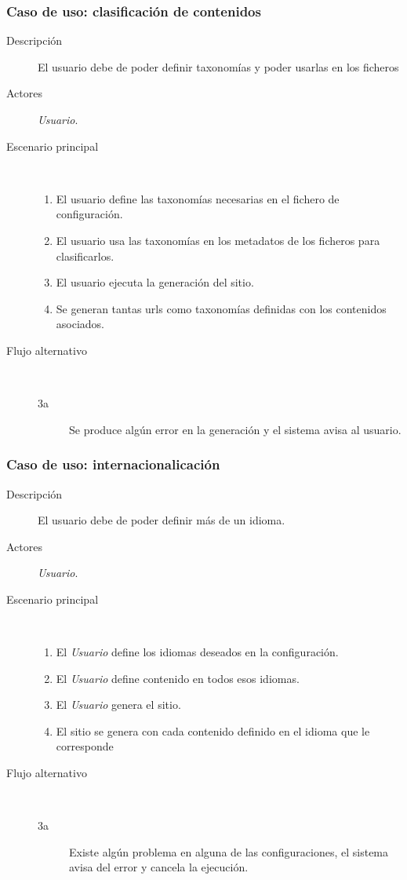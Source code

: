 \subsubsection{Caso de uso: clasificación de contenidos}

\begin{description}
    \item[Descripción] El usuario debe de poder definir taxonomías y poder usarlas en los ficheros
    \item[Actores] \textit{Usuario}.
    \item[Escenario principal] $\quad$
        \begin{enumerate}
            \item El usuario define las taxonomías necesarias en el fichero de configuración.
            \item El usuario usa las taxonomías en los metadatos de los ficheros para clasificarlos.
            \item El usuario ejecuta la generación del sitio.
            \item Se generan tantas urls como taxonomías definidas con los contenidos asociados.
        \end{enumerate}
    \item[Flujo alternativo] $\quad$
        \begin{description}
            \item[3a] Se produce algún error en la generación y el sistema avisa al usuario.
        \end{description}
\end{description}

\subsubsection{Caso de uso: internacionalicación}

\begin{description}
    \item[Descripción] El usuario debe de poder definir más de un idioma.
    \item[Actores] \textit{Usuario}.
    \item[Escenario principal] $\quad$
        \begin{enumerate}
            \item El \textit{Usuario} define los idiomas deseados en la configuración.
            \item El \textit{Usuario} define contenido en todos esos idiomas.
            \item El \textit{Usuario} genera el sitio.
            \item El sitio se genera con cada contenido definido en el idioma que le corresponde
        \end{enumerate}
    \item[Flujo alternativo] $\quad$
        \begin{description}
            \item[3a] Existe algún problema en alguna de las configuraciones, el sistema avisa del error
                y cancela la ejecución.
        \end{description}
\end{description}

